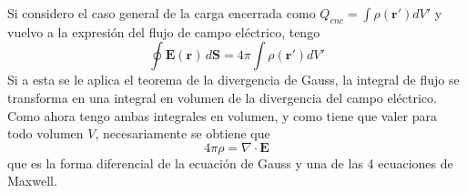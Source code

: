 \indent Si considero el caso general de la carga encerrada como $Q_{enc} = \int \rho(\textbf{r}')dV'$ y vuelvo a la expresión del flujo de campo eléctrico, tengo
\begin{equation*}
    \oint \textbf{E}(\textbf{r})\,d\textbf{S}
    = 4\pi \int \rho(\textbf{r}')dV'
\end{equation*}
Si a esta se le aplica el teorema de la divergencia de Gauss, la integral de flujo se transforma en una integral en volumen de la divergencia del campo eléctrico. Como ahora tengo ambas integrales en volumen, y como tiene que valer para todo volumen $V$, necesariamente se obtiene que
\begin{equation*}
    4\pi\rho = \nabla \cdot \textbf{E}
\end{equation*}
que es la forma diferencial de la ecuación de Gauss y una de las 4 ecuaciones de Maxwell.




